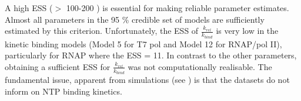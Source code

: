 \documentclass[10pt,letterpaper]{article}
\begin{document}
A high ESS ($>$ 100-200 \cite{rambaut2013tracer}) is essential for making reliable parameter estimates. Almost all parameters in the 95 \% credible set of models are sufficiently estimated by this criterion. Unfortunately, the ESS of $\frac{k_{rel}}{k_{bind}}$ is very low in the kinetic binding models (Model 5 for T7 pol and Model 12 for RNAP/pol II), particularly for RNAP where the ESS = 11. In contrast to the other parameters, obtaining a sufficient ESS for $\frac{k_{rel}}{k_{bind}}$ was not computationally realisable. The fundamental issue, apparent from simulations (see ) is that the datasets do not inform on NTP binding kinetics.






\begin{table}[!ht]
\begin{adjustwidth}{-2.25in}{0in} %
\centering
\caption{
{\bf Summary of posterior distributions from MCMC-ABC experiments.}}
\end{adjustwidth}
\end{table}
\end{document}
